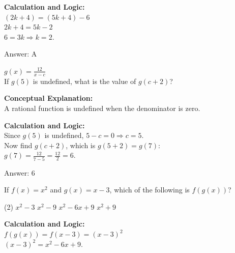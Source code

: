 \documentclass[11pt,paper=a4,answers]{exam}
\begin{document}
\begin{questions}
\begin{solution}
\textbf{Calculation and Logic:} \\
$(2k + 4) = (5k + 4) - 6$ \\
$2k + 4 = 5k - 2$ \\
$6 = 3k \Rightarrow k = 2$.

\vspace{25pt}

Answer: \colorbox{yellow!100}{A}
\end{solution}

\vspace{40pt}

\question
$g(x) = \frac{12}{x-c}$ \\
If $g(5)$ is undefined, what is the value of $g(c+2)$?

\begin{solution}
\textbf{Conceptual Explanation:} \\
A rational function is undefined when the denominator is zero.

\vspace{20pt}

\textbf{Calculation and Logic:} \\
Since $g(5)$ is undefined, $5 - c = 0 \Rightarrow c = 5$. \\
Now find $g(c+2)$, which is $g(5+2) = g(7)$: \\
$g(7) = \frac{12}{7 - 5} = \frac{12}{2} = 6$.

\vspace{25pt}

Answer: \colorbox{yellow!100}{6}
\end{solution}

\vspace{40pt}

\question
If $f(x) = x^2$ and $g(x) = x-3$, which of the following is $f(g(x))$?
\begin{tasks}(2)
    \task $x^2 - 3$
    \task $x^2 - 9$
    \task $x^2 - 6x + 9$
    \task $x^2 + 9$
\end{tasks}

\begin{solution}
\textbf{Calculation and Logic:} \\
$f(g(x)) = f(x-3) = (x-3)^2$ \\
$(x-3)^2 = x^2 - 6x + 9$.

\vspace{25pt}


\end{solution}
\end{questions}
\end{document}
